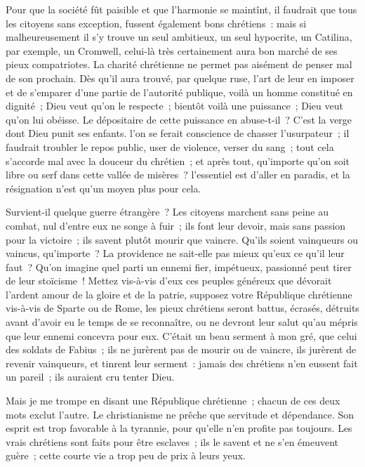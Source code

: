 \documentclass[french,twoside]{book} %
\begin{document}
Pour que la société fût paisible et que l’harmonie se maintînt, il faudrait que tous les citoyens sans exception, fussent également bons chrétiens : mais si malheureusement il s’y trouve un seul ambitieux, un seul hypocrite, un Catilina, par exemple, un Cromwell, celui-là très certainement aura bon marché de ses pieux compatriotes. La charité chrétienne ne permet pas aisément de penser mal de son prochain. Dès qu’il aura trouvé, par quelque ruse, l’art de leur en imposer et de s’emparer d’une partie de l’autorité publique, voilà un homme constitué en dignité ; Dieu veut qu’on le respecte ; bientôt voilà une puissance ; Dieu veut qu’on lui obéisse. Le dépositaire de cette puissance en abuse-t-il ? C’est la verge dont Dieu punit ses enfants. l’on se ferait conscience de chasser l’usurpateur ; il faudrait troubler le repos public, user de violence, verser du sang ; tout cela s’accorde mal avec la douceur du chrétien ; et après tout, qu’importe qu’on soit libre ou serf dans cette vallée de misères ? l’essentiel est d’aller en paradis, et la résignation n’est qu’un moyen plus pour cela.\par
Survient-il quelque guerre étrangère ? Les citoyens marchent sans peine au combat, nul d’entre eux ne songe à fuir ; ils font leur devoir, mais sans passion pour la victoire ; ils savent plutôt mourir que vaincre. Qu’ils soient vainqueurs ou vaincus, qu’importe ? La providence ne sait-elle pas mieux qu’eux ce qu’il leur faut ? Qu’on imagine quel parti un ennemi fier, impétueux, passionné peut tirer de leur stoïcisme ! Mettez vis-à-vis d’eux ces peuples généreux que dévorait l’ardent amour de la gloire et de la patrie, supposez votre République chrétienne vis-à-vis de Sparte ou de Rome, les pieux chrétiens seront battus, écrasés, détruits avant d’avoir eu le temps de se reconnaître, ou ne devront leur salut qu’au mépris que leur ennemi concevra pour eux. C’était un beau serment à mon gré, que celui des soldats de Fabius ; ils ne jurèrent pas de mourir ou de vaincre, ils jurèrent de revenir vainqueurs, et tinrent leur serment : jamais des chrétiens n’en eussent fait un pareil ; ils auraient cru tenter Dieu.\par
Mais je me trompe en disant une République chrétienne ; chacun de ces deux mots exclut l’autre. Le christianisme ne prêche que servitude et dépendance. Son esprit est trop favorable à la tyrannie, pour qu’elle n’en profite pas toujours. Les vrais chrétiens sont faits pour être esclaves ; ils le savent et ne s’en émeuvent guère ; cette courte vie a trop peu de prix à leurs yeux.\par
\end{document}
